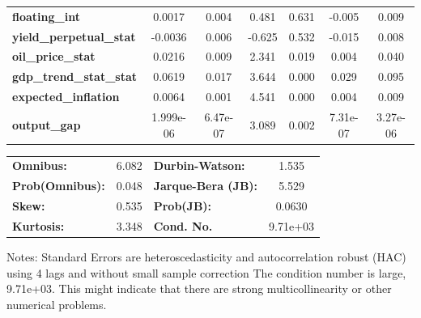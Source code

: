 \begin{center}
\begin{tabular}{lcccccc}
\textbf{floating\_int}          &       0.0017  &        0.004     &     0.481  &         0.631        &       -0.005    &        0.009     \\
\textbf{yield\_perpetual\_stat} &      -0.0036  &        0.006     &    -0.625  &         0.532        &       -0.015    &        0.008     \\
\textbf{oil\_price\_stat}       &       0.0216  &        0.009     &     2.341  &         0.019        &        0.004    &        0.040     \\
\textbf{gdp\_trend\_stat\_stat} &       0.0619  &        0.017     &     3.644  &         0.000        &        0.029    &        0.095     \\
\textbf{expected\_inflation}    &       0.0064  &        0.001     &     4.541  &         0.000        &        0.004    &        0.009     \\
\textbf{output\_gap}            &    1.999e-06  &     6.47e-07     &     3.089  &         0.002        &     7.31e-07    &     3.27e-06     \\
\bottomrule
\end{tabular}
\begin{tabular}{lclc}
\textbf{Omnibus:}       &  6.082 & \textbf{  Durbin-Watson:     } &    1.535  \\
\textbf{Prob(Omnibus):} &  0.048 & \textbf{  Jarque-Bera (JB):  } &    5.529  \\
\textbf{Skew:}          &  0.535 & \textbf{  Prob(JB):          } &   0.0630  \\
\textbf{Kurtosis:}      &  3.348 & \textbf{  Cond. No.          } & 9.71e+03  \\
\bottomrule
\end{tabular}
\end{center}

Notes: \newline
 [1] Standard Errors are heteroscedasticity and autocorrelation robust (HAC) using 4 lags and without small sample correction \newline
 [2] The condition number is large, 9.71e+03. This might indicate that there are \newline
 strong multicollinearity or other numerical problems.